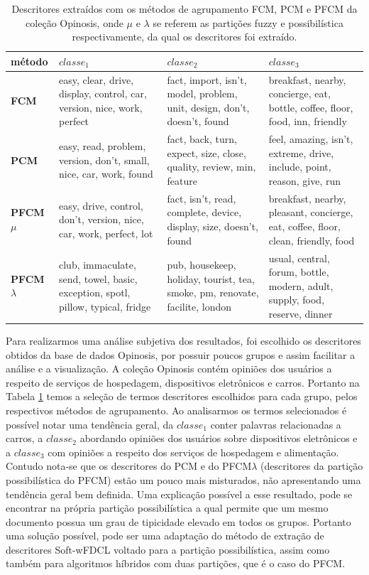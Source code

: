 \begin{table}[!htp]
  \centering
  \begin{tabular}{ |l|p{4cm} | p{4cm} | p{4cm}|}
    \hline
    {\bf método} & $classe_1$ & $classe_2$ & $classe_3$ \\
    \hline
    {\bf FCM} & easy, clear, drive, display, control, car, version, nice, work, perfect & fact,
    import, isn't, model, problem, unit, design, don't, doesn't, found & breakfast, nearby,
    concierge, eat, bottle, coffee, floor, food, inn, friendly \\
    \hline
    {\bf PCM} & easy, read, problem, version, don't, small, nice, car, work, found & fact, back,
    turn, expect, size, close, quality, review, min, feature & feel, amazing, isn't, extreme, drive,
    include, point, reason, give, run\\
    \hline
    {\bf PFCM $\mu$} & easy, drive, control, don't, version, nice, car, work, perfect, lot & fact,
    isn't, read, complete, device, display, size, doesn't, found & breakfast, nearby, pleasant,
    concierge, eat, coffee, floor, clean, friendly, food\\
    \hline
    {\bf PFCM $\lambda$} & club, immaculate, send, towel, basic, exception, spotl, pillow, typical,
    fridge & pub, housekeep, holiday, tourist, tea, smoke, pm, renovate, facilite, london & usual,
    central, forum, bottle, modern, adult, supply, food, reserve, dinner\\
    \hline
  \end{tabular}
  \caption{Descritores extraídos com os métodos de agrupamento FCM, PCM e PFCM da coleção Opinosis,
  onde $\mu$ e $\lambda$ se referem as partições fuzzy e possibilística respectivamente, da qual os
descritores foi extraído.}
  \label{table:pfcmdescriptors}
\end{table}

Para realizarmos uma análise subjetiva dos resultados, foi escolhido os descritores obtidos da base
de dados Opinosis, por possuir poucos grupos e assim facilitar a análise e a visualização. A coleção
Opinosis contém opiniões dos usuários a respeito de serviços de hospedagem, dispositivos eletrônicos
e carros.  Portanto na Tabela \ref{table:pfcmdescriptors} temos a seleção de termos descritores
escolhidos para cada grupo, pelos respectivos métodos de agrupamento. Ao analisarmos os termos
selecionados é possível notar uma tendência geral, da $classe_1$ conter palavras relacionadas a
carros, a $classe_2$ abordando opiniões dos usuários sobre dispositivos eletrônicos e a $classe_3$
com opiniões a respeito dos serviços de hospedagem e alimentação. Contudo nota-se que os descritores
do PCM e do PFCM$\lambda$ (descritores da partição possibilística do PFCM) estão um pouco mais
misturados, não apresentando uma tendência geral bem definida. Uma explicação possível a esse
resultado, pode se encontrar na própria partição possibilística a qual permite que um mesmo
documento possua um grau de tipicidade elevado em todos os grupos. Portanto uma solução possível,
pode ser uma adaptação do método de extração de descritores Soft-wFDCL voltado para a partição
possibilística, assim como também para algoritmos híbridos com duas partições, que é o caso do PFCM.

